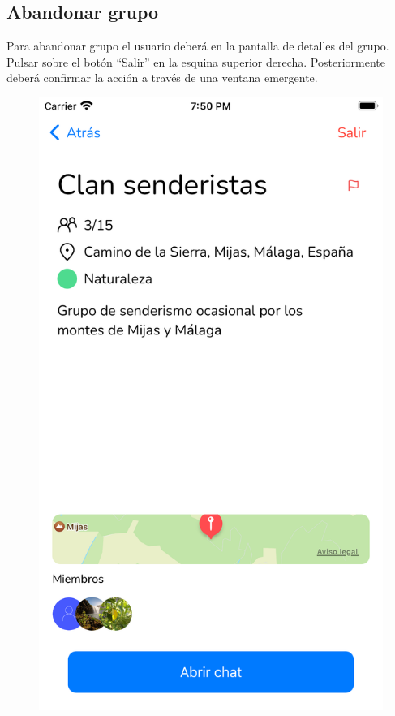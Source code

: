 \begin{appendices}
\section{Abandonar grupo}
Para abandonar grupo el usuario deberá en la pantalla de detalles del grupo. Pulsar sobre el botón ``Salir'' en la esquina superior derecha. Posteriormente deberá confirmar la acción a través de una ventana emergente.

\begin{figure}[H]
        \centering
        \begin{minipage}{0.3\textwidth}
            \centering
            \includegraphics[cframe=black 2pt,width=1\linewidth]{images/manual/groupInfoAsMember.png}

\end{minipage}
\end{figure}
\end{appendices}
